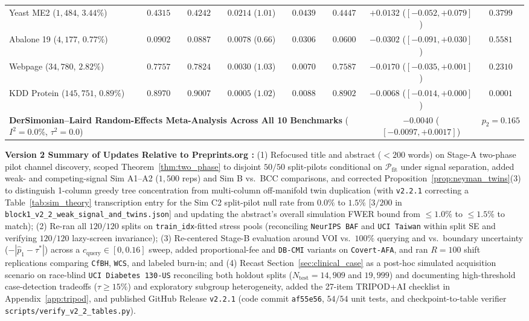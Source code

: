 \documentclass[11pt]{article}
\theoremstyle{remark}
\begin{document}
\begin{table}[h!]
{\begin{tabular}{lccccccc}
Yeast ME2 ($1{,}484$, $3.44\%$) & $0.4315$ & $0.4242$ & $0.0214$ ($1.01$) & $0.0439$ & $0.4447$ & $+0.0132$ ($[-0.052, +0.079]$) & $0.3799$ \\
Abalone 19 ($4{,}177$, $0.77\%$) & $0.0902$ & $0.0887$ & $0.0078$ ($0.66$) & $0.0306$ & $0.0600$ & $-0.0302$ ($[-0.091, +0.030]$) & $0.5581$ \\
Webpage ($34{,}780$, $2.82\%$) & $0.7757$ & $0.7824$ & $0.0030$ ($1.03$) & $0.0070$ & $0.7587$ & $-0.0170$ ($[-0.035, +0.001]$) & $0.2310$ \\
KDD Protein ($145{,}751$, $0.89\%$) & $0.8970$ & $0.9007$ & $0.0005$ ($1.02$) & $0.0088$ & $0.8902$ & $-0.0068$ ($[-0.014, +0.000]$) & $\mathbf{0.0001}$ \\
\midrule
\multicolumn{6}{l}{\textbf{DerSimonian--Laird Random-Effects Meta-Analysis Across All 10 Benchmarks} ($I^2 = 0.0\%$, $\tau^2 = 0.0$)} & $\mathbf{-0.0040}$ ($[-0.0097, +0.0017]$) & $p_2 = 0.165$ \\
\bottomrule
\end{tabular}%
}
\end{table}

{\raggedright\textbf{Version 2 Summary of Updates Relative to Preprints.org :}
(1) Refocused title and abstract ($<200$ words) on Stage-A two-phase pilot channel discovery, scoped Theorem~\ref{thm:two_phase} to disjoint $50/50$ split-pilots conditional on $\mathcal{P}_{\text{fit}}$ under signal separation, added weak- and competing-signal Sim A1--A2 ($1{,}500$ reps) and Sim B vs.\ BCC comparisons, and corrected Proposition~\ref{prop:neyman_twins}(3) to distinguish 1-column greedy tree concentration from multi-column off-manifold twin duplication (with \texttt{v2.2.1} correcting a Table~\ref{tab:sim_theory} transcription entry for the Sim C2 split-pilot null rate from $0.0\%$ to $1.5\%$ [$3/200$ in \texttt{block1\_v2\_2\_weak\_signal\_and\_twins.json}] and updating the abstract's overall simulation FWER bound from $\le 1.0\%$ to $\le 1.5\%$ to match);
(2) Re-ran all $120/120$ splits on \texttt{train\_idx}-fitted stress pools (reconciling \texttt{NeurIPS BAF} and \texttt{UCI Taiwan} within split SE and verifying $120/120$ lazy-screen invariance);
(3) Re-centered Stage-B evaluation around VOI vs.\ $100\%$ querying and vs.\ boundary uncertainty ($-|\hat{p}_1-\tau^*|$) across a $c_{\text{query}} \in [0, 0.16]$ sweep, added proportional-fee and \texttt{DB-CMI} variants on \texttt{Covert-AFA}, and ran $R=100$ shift replications comparing \texttt{CfBH}, \citet{jin2025wcs} \texttt{WCS}, and labeled burn-in; and
(4) Recast Section~\ref{sec:clinical_case} as a post-hoc simulated acquisition scenario on race-blind \texttt{UCI Diabetes 130-US} reconciling both holdout splits ($N_{\text{test}}=14{,}909$ and $19{,}999$) and documenting high-threshold case-detection tradeoffs ($\tau \ge 15\%$) and exploratory subgroup heterogeneity, added the 27-item TRIPOD+AI checklist in Appendix~\ref{app:tripod}, and published GitHub Release \texttt{v2.2.1} (code commit \texttt{af55e56}, $54/54$ unit tests, and checkpoint-to-table verifier \texttt{scripts/verify\_v2\_2\_tables.py}).\par}
\end{document}
